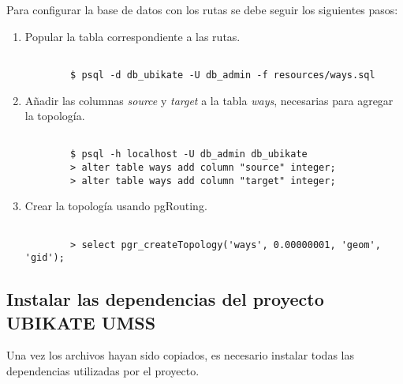 Para configurar la base de datos con los rutas se debe seguir los siguientes pasos:
\begin{enumerate}
  \item Popular la tabla correspondiente a las rutas.

\begin{center}

  \begin{lstlisting}[label=psql_ways,caption=Comando popular la base de datos.]

        $ psql -d db_ubikate -U db_admin -f resources/ways.sql
  \end{lstlisting}
\end{center}

      \item Añadir las columnas \emph{source} y \emph{target} a la tabla \emph{ways}, necesarias para agregar la topología.


\begin{center}

  \begin{lstlisting}[label=add_columns,caption=Agregar las columnas \emph{source} y \emph{target}.]

        $ psql -h localhost -U db_admin db_ubikate
        > alter table ways add column "source" integer;
        > alter table ways add column "target" integer;
  \end{lstlisting}
\end{center}

  \item Crear la topología usando pgRouting.

\begin{center}
  \begin{lstlisting}[label=add_topology,caption=Añadir la topología.]

        > select pgr_createTopology('ways', 0.00000001, 'geom', 'gid');
  \end{lstlisting}
\end{center}

\end{enumerate}

\subsection{Instalar las dependencias del proyecto UBIKATE UMSS}

Una vez los archivos hayan sido copiados, es necesario instalar todas las dependencias utilizadas por el proyecto.


